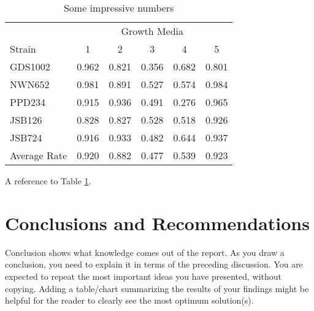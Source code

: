 \documentclass[conference]{IEEEtran}
\begin{document}
\begin{table} %
\centering %
\begin{tabular}{l c c c c c} %
\toprule %
& \multicolumn{5}{c}{Growth Media} \\ %
\cmidrule(l){2-6} %
Strain & 1 & 2 & 3 & 4 & 5\\ %
\midrule %
GDS1002 & 0.962 & 0.821 & 0.356 & 0.682 & 0.801\\ %
NWN652 & 0.981 & 0.891 & 0.527 & 0.574 & 0.984\\ %
PPD234 & 0.915 & 0.936 & 0.491 & 0.276 & 0.965\\ %
JSB126 & 0.828 & 0.827 & 0.528 & 0.518 & 0.926\\ %
JSB724 & 0.916 & 0.933 & 0.482 & 0.644 & 0.937\\ %
\midrule %
\midrule %
Average Rate & 0.920 & 0.882 & 0.477 & 0.539 & 0.923\\ %
\bottomrule %
\end{tabular}
\smallskip 
\caption{Some impressive numbers} %
\label{tab:template} %
\end{table}
A reference to Table \ref{tab:template}.

\section{Conclusions and Recommendations}
Conclusion shows what knowledge comes out of the report. As you draw a conclusion, you need to explain it in terms of the preceding discussion. You are expected to repeat the most important ideas you have presented, without copying. Adding a table/chart summarizing the results of your findings might be helpful for the reader to clearly see the most optimum solution(s). 
\end{document}
